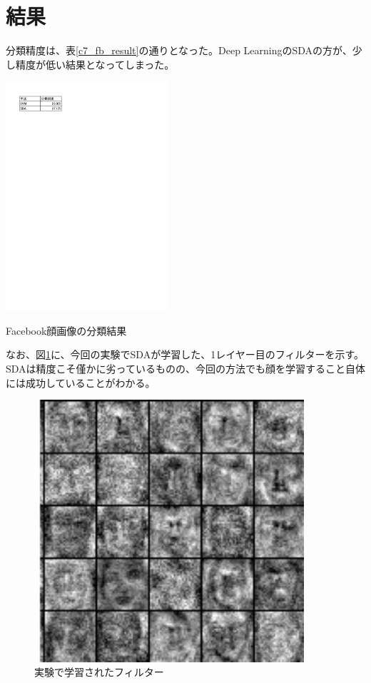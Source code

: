 \section{結果}
分類精度は、表\ref{c7_fb_result}の通りとなった。Deep LearningのSDAの方が、少し精度が低い結果となってしまった。\par
\begin{table}[tbp]
 \begin{center}
  \includegraphics[width=60mm]{img/c7/fb_result}
 \end{center}
 \caption{Facebook顔画像の分類結果}
 \label{c7_fb_result}
\end{table}
なお、図\ref{c7_filter}に、今回の実験でSDAが学習した、1レイヤー目のフィルターを示す。SDAは精度こそ僅かに劣っているものの、今回の方法でも顔を学習すること自体には成功していることがわかる。

\begin{figure}[tbp]
 \begin{center}
  \includegraphics[width=100mm]{img/c7/filter}
 \end{center}
 \caption{実験で学習されたフィルター}
 \label{c7_filter}
\end{figure}